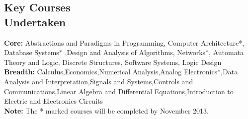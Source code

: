 \documentclass[margin,10pt]{resume}
\begin{document}
\begin{resume}
\section{\mysidestyle Key Courses\\Undertaken}
\textbf{Core:} 
Abstractions and Paradigms in Programming, Computer Architecture*, Database Systems* ,Design and Analysis of Algorithms, Networks*, Automata Theory and Logic, Discrete Structures, Software Systems, Logic Design\\
\textbf{Breadth:} 
Calculus,Economics,Numerical Analysis,Analog Electronics*,Data Analysis and Interpretation,Signals and Systems,Controls and Communications,Linear Algebra and Differential Equations,Introduction to Electric and Electronics Circuits \\
\textbf{Note:} The * marked courses will be completed by November 2013.

\end{resume}
\end{document}
